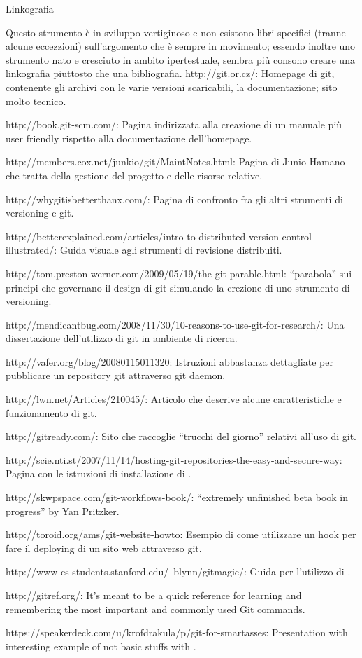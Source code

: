 \capitolo Linkografia

Questo strumento \`e in sviluppo vertiginoso e non esistono libri specifici
(tranne alcune eccezzioni) sull'argomento che \`e sempre in movimento; essendo
inoltre uno strumento nato e cresciuto in ambito ipertestuale, sembra pi\`u
consono creare una linkografia piuttosto che una bibliografia.
\bigskip
\link http://git.or.cz/: Homepage di git, contenente gli archivi con le varie
versioni scaricabili, la documentazione; sito molto tecnico.

\link http://book.git-scm.com/: Pagina indirizzata alla creazione di un manuale
pi\`u user friendly rispetto alla documentazione dell'homepage.

\link http://members.cox.net/junkio/git/MaintNotes.html: Pagina di Junio Hamano che tratta della gestione del progetto e delle risorse relative.

\link http://whygitisbetterthanx.com/: Pagina di confronto fra gli altri
strumenti di versioning e git.

\link
http://betterexplained.com/articles/intro-to-distributed-version-control-illustrated/:
Guida visuale agli strumenti di revisione distribuiti.

\link http://tom.preston-werner.com/2009/05/19/the-git-parable.html:
``parabola'' sui principi che governano il design di git simulando la crezione di uno
strumento di versioning.

\link http://mendicantbug.com/2008/11/30/10-reasons-to-use-git-for-research/:
Una dissertazione dell'utilizzo di git in ambiente di ricerca.

\link http://vafer.org/blog/20080115011320:
Istruzioni abbastanza dettagliate per pubblicare un repository git attraverso
git daemon.

\link http://lwn.net/Articles/210045/: Articolo che descrive alcune
caratteristiche e funzionamento di git.

\link http://gitready.com/: Sito che raccoglie ``trucchi del giorno''
relativi all'uso di git.

\link
http://scie.nti.st/2007/11/14/hosting-git-repositories-the-easy-and-secure-way: Pagina con le istruzioni di installazione di .

\link http://skwpspace.com/git-workflows-book/: ``extremely unfinished beta book
in progress'' by Yan Pritzker.

\link http://toroid.org/ams/git-website-howto: Esempio di come utilizzare un
hook per fare il deploying di un sito web attraverso git.

\link http://www-cs-students.stanford.edu/~blynn/gitmagic/: Guida per l'utilizzo
di .

\link http://gitref.org/: It's meant to be a quick reference for learning and remembering the most important and commonly used Git commands.

\link https://speakerdeck.com/u/krofdrakula/p/git-for-smartasses: Presentation
with interesting example of not basic stuffs with .

\vfill\eject
